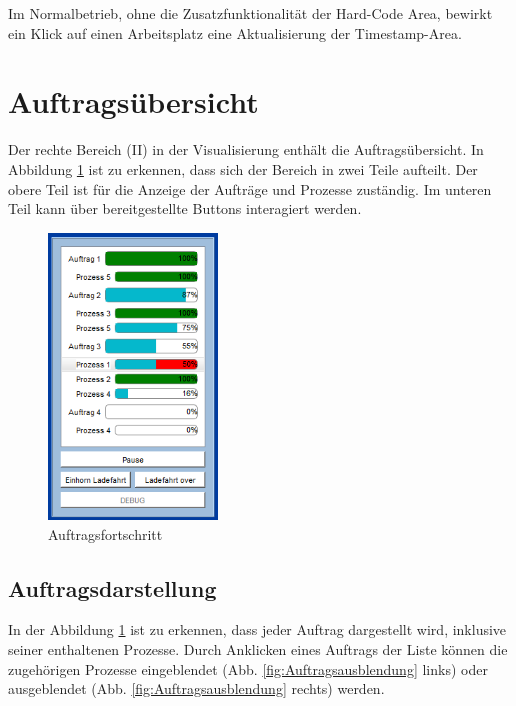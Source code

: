 Im Normalbetrieb, ohne die Zusatzfunktionalität der Hard-Code Area, bewirkt ein Klick auf einen Arbeitsplatz eine Aktualisierung der Timestamp-Area. 

\section{Auftragsübersicht}
\label{sec:Auftragsuebersicht}

Der rechte Bereich (II) in der Visualisierung enthält die Auftragsübersicht. In Abbildung \ref{fig:Auftragsfortschritt} ist zu erkennen, dass sich der Bereich in zwei Teile aufteilt. Der obere Teil ist für die Anzeige der Aufträge und Prozesse zuständig. Im unteren Teil kann über bereitgestellte Buttons interagiert werden.

\begin{figure}[htb]
    \centering
    \includegraphics[width=0.4\textwidth]{Abbildungen/Auftragsfortschritt.png}
    \caption{Auftragsfortschritt}		
    \label{fig:Auftragsfortschritt}
\end{figure}

\subsection{Auftragsdarstellung}

In der Abbildung \ref{fig:Auftragsfortschritt} ist zu erkennen, dass jeder Auftrag dargestellt wird, inklusive seiner enthaltenen Prozesse. Durch Anklicken eines Auftrags der Liste können die zugehörigen Prozesse eingeblendet (Abb. \ref{fig:Auftragsausblendung} links) oder ausgeblendet (Abb. \ref{fig:Auftragsausblendung} rechts) werden. 

